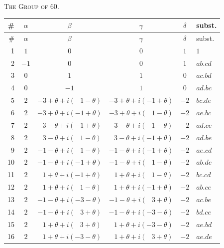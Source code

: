 \documentclass[11pt,a4paper]{article}
\begin{document}
\begin{center}
\textsc{The Group of $60$.}\\[4pt]
\footnotesize
\begin{longtable}{r|c|c|c|c|l}
\# & $\alpha$ & $\beta$ & $\gamma$ & $\delta$ & subst.\\
\hline
\endfirsthead
\hline
\# & $\alpha$ & $\beta$ & $\gamma$ & $\delta$ & subst.\\
\hline
\endhead
1  & $1$  & $0$ & $0$ & $1$  & $1$\\
2  & $-1$ & $0$ & $0$ & $1$  & $ab.cd$\\
3  & $0$  & $1$ & $1$ & $0$  & $ac.bd$\\
4  & $0$  & $-1$& $1$ & $0$  & $ad.bc$\\
5  & $2$  & $-3 + \theta + i(\;\;\,1 - \theta)$
         & $-3 + \theta + i(-1 + \theta)$ & $-2$ & $bc.de$\\
6  & $2$  & $-3 + \theta + i(-1 + \theta)$
         & $-3 + \theta + i(\;\;\,1 - \theta)$ & $-2$ & $ae.bc$\\
7  & $2$  & $\;\;\,3 - \theta + i(-1 + \theta)$
         & $\;\;\,3 - \theta + i(\;\;\,1 - \theta)$ & $-2$ & $ad.ce$\\
8  & $2$  & $\;\;\,3 - \theta + i(\;\;\,1 - \theta)$
         & $\;\;\,3 - \theta + i(-1 + \theta)$ & $-2$ & $ad.be$\\
9  & $2$  & $-1 - \theta + i(\;\;\,1 - \theta)$
         & $-1 - \theta + i(-1 + \theta)$ & $-2$ & $ae.cd$\\
10 & $2$  & $-1 - \theta + i(-1 + \theta)$
         & $-1 - \theta + i(\;\;\,1 - \theta)$ & $-2$ & $ab.de$\\
11 & $2$  & $\;\;\,1 + \theta + i(-1 + \theta)$
         & $\;\;\,1 + \theta + i(\;\;\,1 - \theta)$ & $-2$ & $bc.cd$\\
12 & $2$  & $\;\;\,1 + \theta + i(\;\;\,1 - \theta)$
         & $\;\;\,1 + \theta + i(-1 + \theta)$ & $-2$ & $ab.ce$\\
13 & $2$  & $-1 - \theta + i(-3 - \theta)$
         & $-1 - \theta + i(\;\;\,3 + \theta)$ & $-2$ & $ac.be$\\
14 & $2$  & $-1 - \theta + i(\;\;\,3 + \theta)$
         & $-1 - \theta + i(-3 - \theta)$ & $-2$ & $bd.ce$\\
15 & $2$  & $\;\;\,1 + \theta + i(\;\;\,3 + \theta)$
         & $\;\;\,1 + \theta + i(-3 - \theta)$ & $-2$ & $ae.bd$\\
16 & $2$  & $\;\;\,1 + \theta + i(-3 - \theta)$
         & $\;\;\,1 + \theta + i(\;\;\,3 + \theta)$ & $-2$ & $ae.de$\\

\end{longtable}
\end{center}
\end{document}
